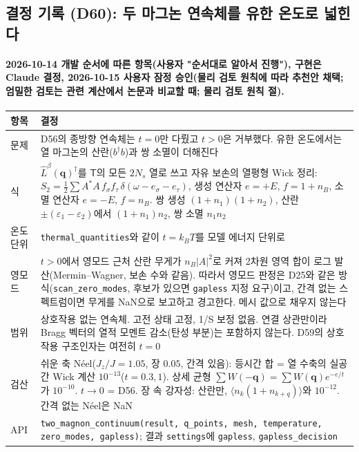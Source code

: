 \subsection{결정 기록 (D60): 두 마그논 연속체를 유한 온도로 넓힌다}\label{decisions-d60-two-magnon-thermal}
\begingroup%
  \framesubtitle{2026-10-14 개발 순서에 따른 항목(사용자 "순서대로 알아서 진행"), 구현은 Claude 결정, 2026-10-15 사용자 잠정 승인(물리 검토 원칙에 따라 추천안 채택; 엄밀한 검토는 관련 계산에서 논문과 비교할 때; 물리 검토 원칙 절).}
  \small\renewcommand{\arraystretch}{1.12}
  \begin{tabularx}{\textwidth}{@{}P{3.0cm}Y@{}}
    \toprule
    항목 & 결정 \\
    \midrule
    문제 & D56의 종방향 연속체는 $t=0$만 다뤘고 $t>0$은 거부했다. 유한 온도에서는 열 마그논의 산란($b^\dagger b$)과 쌍 소멸이 더해진다 \\
    식 & $\hat L^\beta(\mathbf q)^\dagger$를 $\mathsf T$의 모든 $2N_s$ 열로 쓰고 자유 보손의 열평형 Wick 정리: $S_2=\tfrac12\sum A^*A\,f_\sigma f_\tau\,\delta(\omega-e_\sigma-e_\tau)$, 생성 연산자 $e=+E$, $f=1+n_B$, 소멸 연산자 $e=-E$, $f=n_B$. 쌍 생성 $(1+n_1)(1+n_2)$, 산란 $\pm(\varepsilon_1-\varepsilon_2)$에서 $(1+n_1)n_2$, 쌍 소멸 $n_1n_2$ \\
    온도 단위 & \texttt{thermal\_quantities}와 같이 $t=k_BT$를 모델 에너지 단위로 \\
    영모드 & $t>0$에서 영모드 근처 산란 무게가 $n_B|A|^2$로 커져 2차원 영역 합이 로그 발산(Mermin--Wagner, 보손 수와 같음). 따라서 영모드 판정은 D25와 같은 방식(\texttt{scan\_zero\_modes}, 후보가 있으면 \texttt{gapless} 지정 요구)이고, 간격 없는 스펙트럼이면 무게를 NaN으로 보고하고 경고한다. 메시 값으로 채우지 않는다 \\
    범위 & 상호작용 없는 연속체. 고전 상태 고정, 1/S 보정 없음. 연결 상관만이라 Bragg 벡터의 열적 모멘트 감소(탄성 부분)는 포함하지 않는다. D59의 상호작용 구조인자는 여전히 $t=0$ \\
    검산 & 쉬운 축 Néel($J_z/J=1.05$, 장 $0.05$, 간격 있음): 등시간 합 = 열 수축의 실공간 Wick 계산 $10^{-13}$($t=0.3,1$). 상세 균형 $\sum W(-\mathbf q)=\sum W(\mathbf q)e^{-e/t}$가 $10^{-10}$. $t\to0$ = D56. 장 속 강자성: 산란만, $\langle n_k(1+n_{k+q})\rangle$와 $10^{-12}$. 간격 없는 Néel은 NaN \\
    API & \texttt{two\_magnon\_continuum(result, q\_points, mesh, temperature, zero\_modes, gapless)}; 결과 \texttt{settings}에 \texttt{gapless}, \texttt{gapless\_decision} \\
    \bottomrule
  \end{tabularx}
\endgroup

